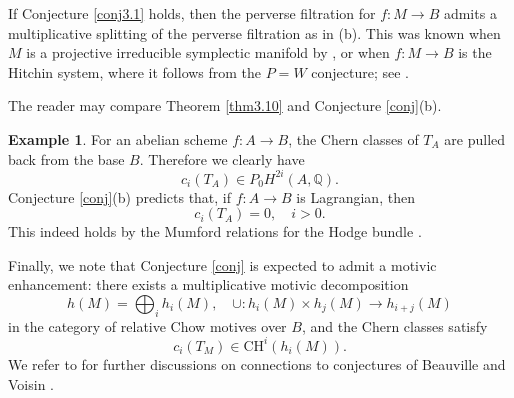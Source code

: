 \documentclass[11pt]{amsart}
\theoremstyle{plain}
\theoremstyle{definition}
\newtheorem{example}[thm]{Example}
\theoremstyle{remark}
\newcommand{\BQ}{{\mathbb{Q}}}
\begin{document}
If Conjecture \ref{conj3.1} holds, then the perverse filtration for $f: M \to B$ admits a multiplicative splitting of the perverse filtration as in (b). This was known when $M$ is a projective irreducible symplectic manifold by \cite[Appendix A]{SY0}, or when $f: M \to B$ is the Hitchin system, where it follows from the $P=W$ conjecture; see \cite[Sections 0.3]{dCMS}. 

The reader may compare Theorem \ref{thm3.10} and Conjecture \ref{conj}(b).

\begin{example}
    For an abelian scheme $f: A\to B$, the Chern classes of $T_A$ are pulled back from the base $B$. Therefore we clearly have
    \[
    c_{i}(T_A) \in P_0H^{2i}(A, \BQ).
    \]
    Conjecture \ref{conj}(b) predicts that, if $f: A\to B$ is Lagrangian, then
    \[
    c_i(T_A)= 0, \quad i >0.
    \]
    This indeed holds by the Mumford relations for the Hodge bundle \cite[Corollary 5.3]{Mumford}.
\end{example}

Finally, we note that Conjecture \ref{conj} is expected to admit a motivic enhancement: there exists a multiplicative motivic decomposition
\[
h(M)  = \bigoplus_{i} h_i(M), \quad \cup: h_i(M) \times h_{j}(M) \to h_{i+j}(M)
\]
in the category of relative Chow motives over $B$, and the Chern classes satisfy
\[
c_i(T_M) \in \mathrm{CH}^{i}( h_{i}(M) ).
\]
We refer to \cite[Section 3]{BMSY1} for further discussions on connections to conjectures of Beauville and Voisin \cite{B2, Voi0, Voi1}.
\end{document}
